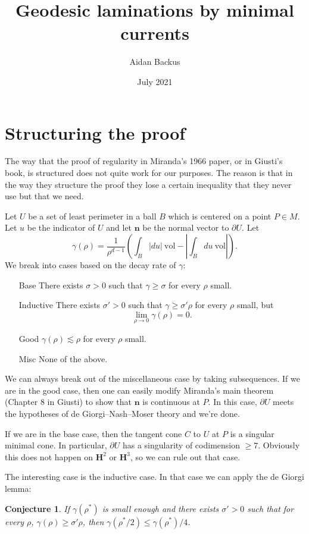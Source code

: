 \documentclass[reqno,12pt,letterpaper]{amsart}
\title[Geodesic laminations by minimal currents]{Geodesic laminations by minimal currents}
\author{Aidan Backus}
\date{July 2021}
\newcommand{\Hyp}{\mathbf H}
\newcommand{\normal}{\mathbf n}
\newcommand{\vol}{\mathrm{vol}}
\newtheorem{conjecture}[theorem]{Conjecture}
\theoremstyle{definition}
\numberwithin{equation}{section}
\begin{document}


\section{Structuring the proof}
The way that the proof of regularity in Miranda's 1966 paper, or in Giusti's book, is structured does not quite work for our purposes.
The reason is that in the way they structure the proof they lose a certain inequality that they never use but that we need.

Let $U$ be a set of least perimeter in a ball $B$ which is centered on a point $P \in M$.
Let $u$ be the indicator of $U$ and let $\normal$ be the normal vector to $\partial U$.
Let
$$\gamma(\rho) = \frac{1}{\rho^{d - 1}} \left(\int_B |du| ~\vol - \left|\int_B du ~\vol\right|\right).$$
We break into cases based on the decay rate of $\gamma$:

\begin{itemize}
\item[Base] There exists $\sigma > 0$ such that $\gamma \geq \sigma$ for every $\rho$ small.
\item[Inductive] There exists $\sigma' > 0$ such that $\gamma \geq \sigma' \rho$ for every $\rho$ small, but
$$\lim_{\rho \to 0} \gamma(\rho) = 0.$$
\item[Good] $\gamma(\rho) \lesssim \rho$ for every $\rho$ small.
\item[Misc] None of the above.
\end{itemize}

We can always break out of the miscellaneous case by taking subsequences.
If we are in the good case, then one can easily modify Miranda's main theorem (Chapter 8 in Giusti) to show that $\normal$ is continuous at $P$.
In this case, $\partial U$ meets the hypotheses of de Giorgi--Nash--Moser theory and we're done.

If we are in the base case, then the tangent cone $C$ to $U$ at $P$ is a singular minimal cone.
In particular, $\partial U$ has a singularity of codimension $\geq 7$.
Obviously this does not happen on $\Hyp^2$ or $\Hyp^3$, so we can rule out that case.

The interesting case is the inductive case.
In that case we can apply the de Giorgi lemma:

\begin{conjecture}
If $\gamma(\rho^*)$ is small enough and there exists $\sigma' > 0$ such that for every $\rho$, $\gamma(\rho) \geq \sigma' \rho$, then $\gamma(\rho^*/2) \leq \gamma(\rho^*)/4$.
\end{conjecture}
\end{document}
